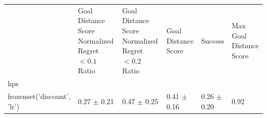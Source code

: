 \begin{tabular}{llllll}
\toprule
 & Goal Distance Score Normalized Regret $< 0.1$ Ratio & Goal Distance Score Normalized Regret $< 0.2$ Ratio & Goal Distance Score & Success & Max Goal Distance Score \\
hps &  &  &  &  &  \\
\midrule
frozenset({'discount', 'lr'}) & 0.27 $\pm$ 0.21 & 0.47 $\pm$ 0.25 & 0.41 $\pm$ 0.16 & 0.26 $\pm$ 0.20 & 0.92 \\
\bottomrule
\end{tabular}
